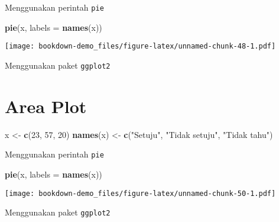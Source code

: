 \documentclass[
]{book}
\newenvironment{Shaded}{\begin{snugshade}}{\end{snugshade}}
\newcommand{\DataTypeTok}[1]{\textcolor[rgb]{0.13,0.29,0.53}{#1}}
\newcommand{\DecValTok}[1]{\textcolor[rgb]{0.00,0.00,0.81}{#1}}
\newcommand{\KeywordTok}[1]{\textcolor[rgb]{0.13,0.29,0.53}{\textbf{#1}}}
\newcommand{\NormalTok}[1]{#1}
\newcommand{\StringTok}[1]{\textcolor[rgb]{0.31,0.60,0.02}{#1}}
\begin{document}
Menggunakan perintah \texttt{pie}

\begin{Shaded}
\begin{Highlighting}[]
\KeywordTok{pie}\NormalTok{(x, }\DataTypeTok{labels =} \KeywordTok{names}\NormalTok{(x))}
\end{Highlighting}
\end{Shaded}

\texttt{[image: bookdown-demo\_files/figure-latex/unnamed-chunk-48-1.pdf]}

Menggunakan paket \texttt{ggplot2}

\hypertarget{area-plot}{%
\section{Area Plot}\label{area-plot}}

\begin{Shaded}
\begin{Highlighting}[]
\NormalTok{x <-}\StringTok{ }\KeywordTok{c}\NormalTok{(}\DecValTok{23}\NormalTok{, }\DecValTok{57}\NormalTok{, }\DecValTok{20}\NormalTok{)}
\KeywordTok{names}\NormalTok{(x) <-}\StringTok{ }\KeywordTok{c}\NormalTok{(}\StringTok{"Setuju"}\NormalTok{, }\StringTok{"Tidak setuju"}\NormalTok{, }\StringTok{"Tidak tahu"}\NormalTok{)}
\end{Highlighting}
\end{Shaded}

Menggunakan perintah \texttt{pie}

\begin{Shaded}
\begin{Highlighting}[]
\KeywordTok{pie}\NormalTok{(x, }\DataTypeTok{labels =} \KeywordTok{names}\NormalTok{(x))}
\end{Highlighting}
\end{Shaded}

\texttt{[image: bookdown-demo\_files/figure-latex/unnamed-chunk-50-1.pdf]}

Menggunakan paket \texttt{ggplot2}

  
\end{document}
